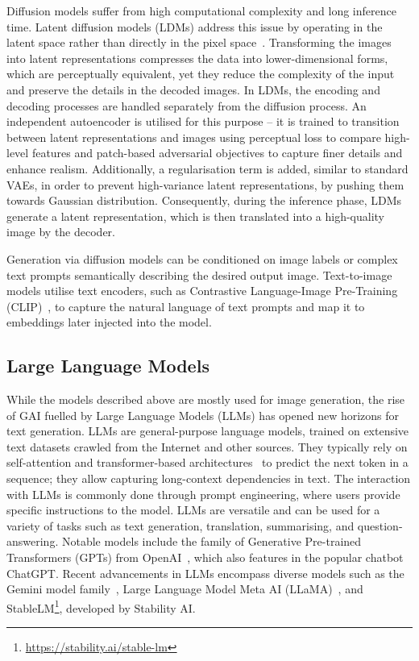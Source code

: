 \documentclass[conference,table]{IEEEtran}
\begin{document}
Diffusion models suffer from high computational complexity and long inference time. Latent diffusion models (LDMs) address this issue by operating in the latent space rather than directly in the pixel space~\cite{rombach_high-resolution_2022}. Transforming the images into latent representations compresses the data into lower-dimensional forms, which are perceptually equivalent, yet they reduce the complexity of the input and preserve the details in the decoded images.
In LDMs, the encoding and decoding processes are handled separately from the diffusion process. An independent autoencoder is utilised for this purpose -- it is trained to transition between latent representations and images using perceptual loss to compare high-level features and patch-based adversarial objectives to capture finer details and enhance realism. 
Additionally, a regularisation term is added, similar to standard VAEs, in order to prevent high-variance latent representations, by pushing them towards Gaussian distribution. 
Consequently, during the inference phase, LDMs generate a latent representation, which is then translated into a high-quality image by the decoder.

Generation via diffusion models can be conditioned on image labels or complex text prompts semantically describing the desired output image. Text-to-image models utilise text encoders, such as Contrastive Language-Image Pre-Training (CLIP)~\cite{radford_learning_2021}, to capture the natural language of text prompts and map it to embeddings later injected into the model.

\subsection{Large Language Models}
While the models described above are mostly used for image generation, the rise of GAI fuelled by Large Language Models (LLMs) has opened new horizons for text generation. LLMs are general-purpose language models, trained on extensive text datasets crawled from the Internet and other sources. They typically rely on self-attention and transformer-based architectures~\cite{vaswani_attention_2017} to predict the next token in a sequence; they allow capturing long-context dependencies in text. The interaction with LLMs is commonly done through prompt engineering, where users provide specific instructions to the model. LLMs are versatile and can be used for a variety of tasks such as text generation, translation, summarising, and question-answering. Notable models include the family of Generative Pre-trained Transformers (GPTs) from OpenAI~\cite{radford_improving_nodate, openai_gpt-4_2023}, which also features in the popular chatbot ChatGPT. 
Recent advancements in LLMs encompass diverse models such as the Gemini model family~\cite{gemini_team_gemini_2023}, Large Language Model Meta AI (LLaMA)~\cite{touvron_llama_2023}, and StableLM\footnote{\url{https://stability.ai/stable-lm}}, developed by Stability AI.
\end{document}
